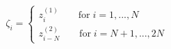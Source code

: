 \begin{equation}
\label{zeta}
\zeta_i=\left\{ 
\begin{array}{l}
z_i^{(1)} \qquad {\mbox{for}}\; i=1, ... ,N\\
z_{i-N}^{(2)}\qquad {\mbox{for}}\; i=N+1, ... ,2N
\end{array}
\right.
\end{equation}


